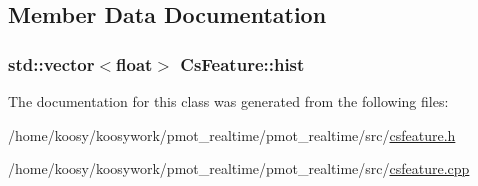 \subsection{\-Member \-Data \-Documentation}
\hypertarget{class_cs_feature_ab2e8bb8a3f95b4b38b8c8d81f6e08a53}{
\subsubsection[{hist}]{\setlength{\rightskip}{0pt plus 5cm}std\-::vector$<$float$>$ {\bf \-Cs\-Feature\-::hist}}}\label{class_cs_feature_ab2e8bb8a3f95b4b38b8c8d81f6e08a53}


\-The documentation for this class was generated from the following files\-:\begin{DoxyCompactItemize}
\item 
/home/koosy/koosywork/pmot\-\_\-realtime/pmot\-\_\-realtime/src/\hyperlink{csfeature_8h}{csfeature.\-h}\item 
/home/koosy/koosywork/pmot\-\_\-realtime/pmot\-\_\-realtime/src/\hyperlink{csfeature_8cpp}{csfeature.\-cpp}\end{DoxyCompactItemize}
